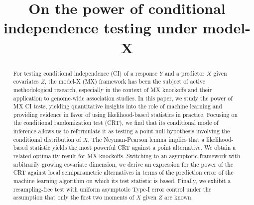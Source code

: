 \documentclass[ejs]{imsart}
\numberwithin{equation}{section}
\theoremstyle{plain}
\theoremstyle{definition}
\theoremstyle{remark}
\begin{document}
\begin{frontmatter}
\title{On the power of conditional independence testing under model-X }

\begin{aug}
\author{ }
\address{Department of Statistics and Data Science, University of Pennsylvania \\
}

\author{ }
\address{Department of Statistics and Data Science, Carnegie Mellon University\\
Machine Learning Department, Carnegie Mellon University \\
}


\end{aug}

\begin{abstract}
       For testing conditional independence (CI) of a response $Y$ and a predictor $X$ given covariates $Z$, the model-X (MX) framework has been the subject of active methodological research, especially in the context of MX knockoffs and their application to genome-wide association studies. In this paper, we study the power of MX CI tests, yielding quantitative insights into the role of machine learning and providing evidence in favor of using likelihood-based statistics in practice. Focusing on the conditional randomization test (CRT), we find that its conditional mode of inference allows us to reformulate it as testing a point null hypothesis involving the conditional distribution of $X$. The Neyman-Pearson lemma implies that a likelihood-based statistic yields the most powerful CRT against a point alternative. We obtain a related optimality result for MX knockoffs. Switching to an asymptotic framework with arbitrarily growing covariate dimension, we derive an expression for the power of the CRT against local semiparametric alternatives in terms of the prediction error of the machine learning algorithm on which its test statistic is based. Finally, we exhibit a resampling-free test with uniform asymptotic Type-I error control under the assumption that only the first two moments of $X$ given $Z$ are known.
\end{abstract}

\begin{keyword}[class=MSC]
\end{keyword}

\begin{keyword}
\end{keyword}
\tableofcontents
\end{frontmatter}
\end{document}
